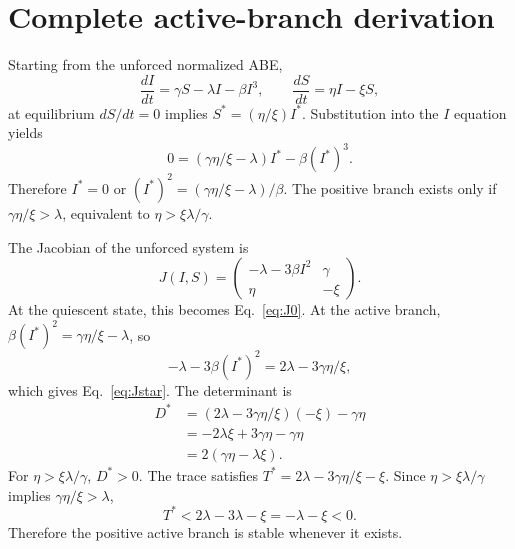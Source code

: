 \documentclass[11pt]{article}
\begin{document}
\appendix
\section{Complete active-branch derivation}
Starting from the unforced normalized ABE,
\begin{equation*}
\frac{dI}{dt}=\gamma S-\lambda I-\beta I^3,\qquad \frac{dS}{dt}=\eta I-\xi S,
\end{equation*}
at equilibrium $dS/dt=0$ implies $S^*=(\eta/\xi)I^*$. Substitution into the $I$ equation yields
\begin{equation*}
0=(\gamma\eta/\xi-\lambda)I^*-\beta(I^*)^3.
\end{equation*}
Therefore $I^*=0$ or $(I^*)^2=(\gamma\eta/\xi-\lambda)/\beta$. The positive branch exists only if $\gamma\eta/\xi>\lambda$, equivalent to $\eta>\xi\lambda/\gamma$.

The Jacobian of the unforced system is
\begin{equation*}
J(I,S)=\begin{pmatrix}-\lambda-3\beta I^2 & \gamma\\ \eta & -\xi\end{pmatrix}.
\end{equation*}
At the quiescent state, this becomes Eq.~\eqref{eq:J0}. At the active branch, $\beta(I^*)^2=\gamma\eta/\xi-\lambda$, so
\begin{equation*}
-\lambda-3\beta(I^*)^2=2\lambda-3\gamma\eta/\xi,
\end{equation*}
which gives Eq.~\eqref{eq:Jstar}. The determinant is
\begin{align*}
D^*&=(2\lambda-3\gamma\eta/\xi)(-\xi)-\gamma\eta\\
&=-2\lambda\xi+3\gamma\eta-\gamma\eta\\
&=2(\gamma\eta-\lambda\xi).
\end{align*}
For $\eta>\xi\lambda/\gamma$, $D^*>0$. The trace satisfies $T^*=2\lambda-3\gamma\eta/\xi-\xi$. Since $\eta>\xi\lambda/\gamma$ implies $\gamma\eta/\xi>\lambda$,
\begin{equation*}
T^*<2\lambda-3\lambda-\xi=-\lambda-\xi<0.
\end{equation*}
Therefore the positive active branch is stable whenever it exists.
\end{document}
